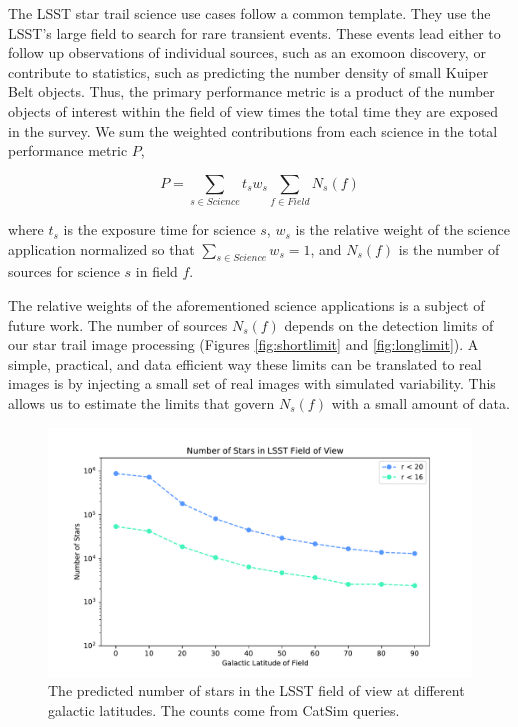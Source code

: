 \documentclass[12pt, letterpaper]{article}
\begin{document}
The LSST star trail science use cases follow a common template. They use the LSST's large field to search for rare transient events. These events lead either to follow up observations of individual sources, such as an exomoon discovery, or contribute to statistics, such as predicting the number density of small Kuiper Belt objects. Thus, the primary performance metric is a product of the number objects of interest within the field of view times the total time they are exposed in the survey. We sum the weighted contributions from each science in the total performance metric $P$,

$$P = \sum_{s \in Science} t_s w_s \sum_{f \in Field} N_s(f)$$

\noindent where $t_{s}$ is the exposure time for science $s$, $w_s$ is the relative weight of the science application normalized so that $\sum_{s \in Science} w_s = 1$, and $N_s(f)$ is the number of sources for science $s$ in field $f$.

The relative weights of the aforementioned science applications is a subject of future work. The number of sources $N_s(f)$ depends on the detection limits of our star trail image processing (Figures \ref{fig:shortlimit} and \ref{fig:longlimit}). A simple, practical, and data efficient way these limits can be translated to real images is by injecting a small set of real images with simulated variability. This allows us to estimate the limits that govern $N_s(f)$ with a small amount of data.

\begin{figure}
\center
\includegraphics[width=0.95\columnwidth]{starcount.pdf}
\caption{The predicted number of stars in the LSST field of view at different galactic latitudes. The counts come from CatSim queries.}
\label{fig:count}
\end{figure}
\end{document}
